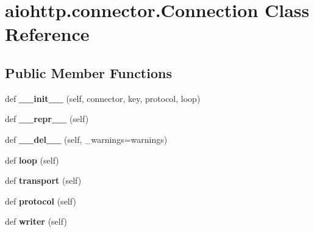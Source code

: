 \hypertarget{classaiohttp_1_1connector_1_1_connection}{}\section{aiohttp.\+connector.\+Connection Class Reference}
\label{classaiohttp_1_1connector_1_1_connection}
\subsection*{Public Member Functions}
\begin{DoxyCompactItemize}
\item 
\mbox{\label{classaiohttp_1_1connector_1_1_connection_a5d5dd3b6208d5862f75e9fac18d5f96d}} 
def {\bfseries \+\_\+\+\_\+init\+\_\+\+\_\+} (self, connector, key, protocol, loop)
\item 
\mbox{\label{classaiohttp_1_1connector_1_1_connection_a3b6f2beb502da64c85e2bbc063868736}} 
def {\bfseries \+\_\+\+\_\+repr\+\_\+\+\_\+} (self)
\item 
\mbox{\label{classaiohttp_1_1connector_1_1_connection_a303c27931669537422b9c091cd98a050}} 
def {\bfseries \+\_\+\+\_\+del\+\_\+\+\_\+} (self, \+\_\+warnings=warnings)
\item 
\mbox{\label{classaiohttp_1_1connector_1_1_connection_a1fe57f6896233262f8bbd694cd20fc5c}} 
def {\bfseries loop} (self)
\item 
\mbox{\label{classaiohttp_1_1connector_1_1_connection_aad14ba7cea6a955cf3b286429fb31439}} 
def {\bfseries transport} (self)
\item 
\mbox{\label{classaiohttp_1_1connector_1_1_connection_a7e59221d405505f9cc2529bbb8b8162c}} 
def {\bfseries protocol} (self)
\item 
\mbox{\label{classaiohttp_1_1connector_1_1_connection_accd89f9a78353ef3149aad2abcae5b01}} 
def {\bfseries writer} (self)
\item 

\end{DoxyCompactItemize}
